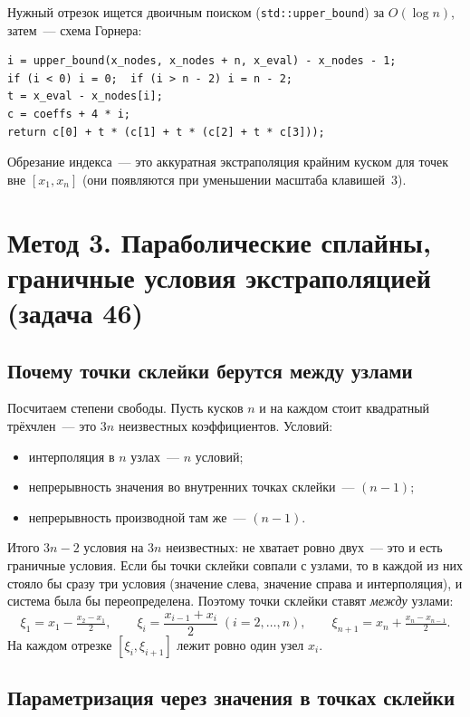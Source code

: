 \documentclass[11pt,a4paper]{report}
\begin{document}
Нужный отрезок ищется двоичным поиском (\texttt{std::upper\_bound}) за
$O(\log n)$, затем~--- схема Горнера:
\begin{lstlisting}[style=cpp]
i = upper_bound(x_nodes, x_nodes + n, x_eval) - x_nodes - 1;
if (i < 0) i = 0;  if (i > n - 2) i = n - 2;
t = x_eval - x_nodes[i];
c = coeffs + 4 * i;
return c[0] + t * (c[1] + t * (c[2] + t * c[3]));
\end{lstlisting}
Обрезание индекса~--- это аккуратная экстраполяция крайним куском для точек вне
$[x_1,x_n]$ (они появляются при уменьшении масштаба клавишей~3).

\section{Метод 3. Параболические сплайны, граничные условия экстраполяцией (задача 46)}

\subsection{Почему точки склейки берутся между узлами}

Посчитаем степени свободы. Пусть кусков $n$ и на каждом стоит квадратный
трёхчлен~--- это $3n$ неизвестных коэффициентов. Условий:
\begin{itemize}[nosep]
\item интерполяция в $n$ узлах~--- $n$ условий;
\item непрерывность значения во внутренних точках склейки~--- $(n-1)$;
\item непрерывность производной там же~--- $(n-1)$.
\end{itemize}
Итого $3n-2$ условия на $3n$ неизвестных: не хватает ровно двух~--- это и есть
граничные условия. Если бы точки склейки совпали с узлами, то в каждой из них
стояло бы сразу три условия (значение слева, значение справа и интерполяция), и
система была бы переопределена. Поэтому точки склейки ставят \emph{между}
узлами:
\[
\xi_1=x_1-\tfrac{x_2-x_1}{2},\qquad
\xi_i=\frac{x_{i-1}+x_i}{2}\;(i=2,\dots,n),\qquad
\xi_{n+1}=x_n+\tfrac{x_n-x_{n-1}}{2}.
\]
На каждом отрезке $[\xi_i,\xi_{i+1}]$ лежит ровно один узел $x_i$.

\subsection{Параметризация через значения в точках склейки}
\end{document}
